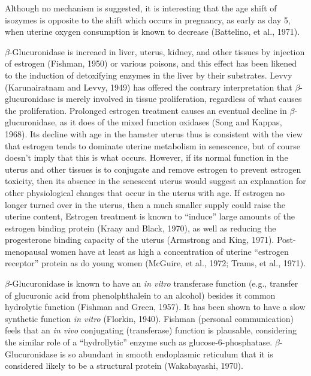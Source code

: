 Although no mechanism is suggested, it is interesting that the age shift of isozymes is opposite to the shift which occurs in pregnancy, as early as day 5, when uterine oxygen consumption is known to decrease (Battelino, et al., 1971).

$\beta$-Glucuronidase is increaed in liver, uterus, kidney, and other tissues by injection of estrogen (Fishman, 1950) or various poisons, and this effect has been likened to the induction of detoxifying enzymes in the liver by their substrates. Levvy (Karunairatnam and Levvy, 1949) has offered the contrary interpretation that $\beta$-glucuronidase is merely involved in tissue proliferation, regardless of what causes the proliferation. Prolonged estrogen treatment causes an eventual decline in $\beta$-glucuronidase, as it does of the mixed function oxidases (Song and Kappas, 1968). Its decline with age in the hamster uterus thus is consistent with the view that estrogen tends to dominate uterine metabolism in senescence, but of course doesn't imply that this is what occurs. However, if its normal function in the uterus and other tissues is to conjugate and remove estrogen to prevent estrogen toxicity, then its absence in the senescent uterus would suggest an explanation for other physiological changes that occur in the uterus with age. If estrogen no longer turned over in the uterus, then a much smaller supply could raise the uterine content, Estrogen treatment is known to ``induce'' large amounts of the estrogen binding protein (Kraay and Black, 1970), as well as reducing the progesterone binding capacity of the uterus (Armstrong and King, 1971). Post-menopausal women have at least as high a concentration of uterine ``estrogen receptor'' protein as do young women (McGuire, et al., 1972; Trams, et al., 1971).

$\beta$-Glucuronidase is known to have an \textit{in vitro} transferase function (e.g., transfer of glucuronic acid from phenolphthalein to an alcohol) besides it common hydrolytic function (Fishman and Green, 1957). It has been shown to have a slow synthetic function \textit{in vitro} (Florkin, 1940). Fishman (personal communication) feels that an \textit{in vivo} conjugating (transferase) function is plausable, considering the similar role of a ``hydrollytic'' enzyme such as glucose-6-phosphatase. $\beta$-Glucuronidase is so abundant in smooth endoplasmic reticulum that it is considered likely to be a structural protein (Wakabayashi, 1970).

